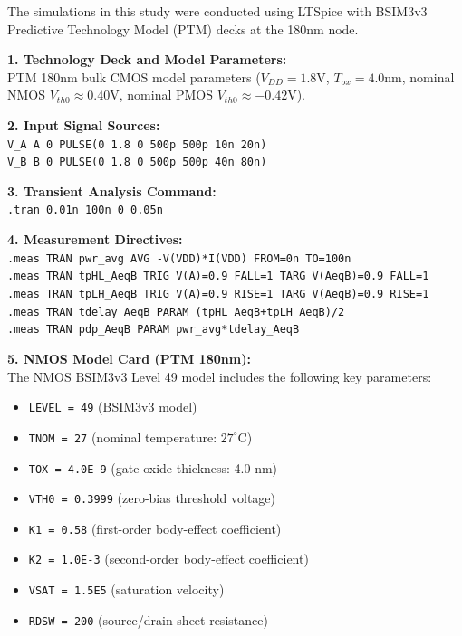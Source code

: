 \documentclass[12pt,a4paper,oneside]{report}
\begin{document}
\vspace{0.3cm}
\noindent The simulations in this study were conducted using LTSpice with BSIM3v3 Predictive Technology Model (PTM) decks at the 180nm node.

\vspace{0.3cm}
\noindent\textbf{1. Technology Deck and Model Parameters:}\\
PTM 180nm bulk CMOS model parameters ($V_{DD} = 1.8\text{V}$, $T_{ox} = 4.0\text{nm}$, nominal NMOS $V_{th0} \approx 0.40\text{V}$, nominal PMOS $V_{th0} \approx -0.42\text{V}$).

\vspace{0.3cm}
\noindent\textbf{2. Input Signal Sources:}\\
\texttt{V\_A A 0 PULSE(0 1.8 0 500p 500p 10n 20n)}\\
\texttt{V\_B B 0 PULSE(0 1.8 0 500p 500p 40n 80n)}

\vspace{0.3cm}
\noindent\textbf{3. Transient Analysis Command:}\\
\texttt{.tran 0.01n 100n 0 0.05n}

\vspace{0.3cm}
\noindent\textbf{4. Measurement Directives:}\\
\texttt{.meas TRAN pwr\_avg AVG -V(VDD)*I(VDD) FROM=0n TO=100n}\\
\texttt{.meas TRAN tpHL\_AeqB TRIG V(A)=0.9 FALL=1 TARG V(AeqB)=0.9 FALL=1}\\
\texttt{.meas TRAN tpLH\_AeqB TRIG V(A)=0.9 RISE=1 TARG V(AeqB)=0.9 RISE=1}\\
\texttt{.meas TRAN tdelay\_AeqB PARAM (tpHL\_AeqB+tpLH\_AeqB)/2}\\
\texttt{.meas TRAN pdp\_AeqB PARAM pwr\_avg*tdelay\_AeqB}

\vspace{0.5cm}
\noindent\textbf{5. NMOS Model Card (PTM 180nm):}\\
The NMOS BSIM3v3 Level 49 model includes the following key parameters:
\begin{itemize}
\item \texttt{LEVEL = 49} (BSIM3v3 model)
\item \texttt{TNOM = 27} (nominal temperature: $27^\circ\text{C}$)
\item \texttt{TOX = 4.0E-9} (gate oxide thickness: 4.0 nm)
\item \texttt{VTH0 = 0.3999} (zero-bias threshold voltage)
\item \texttt{K1 = 0.58} (first-order body-effect coefficient)
\item \texttt{K2 = 1.0E-3} (second-order body-effect coefficient)
\item \texttt{VSAT = 1.5E5} (saturation velocity)
\item \texttt{RDSW = 200} (source/drain sheet resistance)
\end{itemize}
\end{document}
